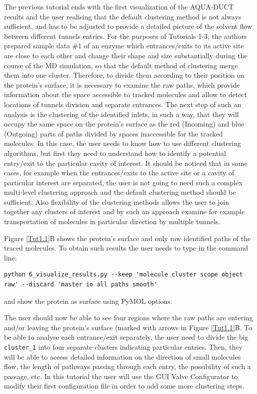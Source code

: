 \documentclass[9pt,tutorial]{livecoms}
\begin{document}
The previous tutorial ends with the first visualization of the AQUA-DUCT results and the user realising that the default clustering method is not always sufficient, and has to be adjusted to provide a detailed picture of the solvent flow between different tunnels entries. For the purposes of Tutorials 1-3, the authors prepared sample data \#1 of an enzyme which entrances/exits to its active site are close to each other and change their shape and size substantially during the course of the MD simulation, so that the default method of clustering merge them into one cluster. Therefore, to divide them according to their position on the protein's surface, it is necessary to examine the raw paths, which provide information about the space accessible to tracked molecules and allow to detect locations of tunnels division and separate entrances. The next step of such an analysis is the clustering of the identified inlets, in such a way, that they will occupy the same space on the protein's surface as the red (Incoming) and blue (Outgoing) parts of paths divided by spaces inaccessible for the tracked molecules. In this case, the user needs to know how to use different clustering algorithms, but first they need to understand how to identify a potential entry/exit to the particular cavity of interest. It should be noticed that in some cases, for example when the entrances/exits to the active site or a cavity of particular interest are separated, the user is not going to need such a complex multi-level clustering approach and the default clustering method should be sufficient. Also flexibility of the clustering methods allows the user to join together any clusters of interest and by such an approach examine for example transportation of molecules in particular direction by multiple tunnels.

Figure \ref{Tut1.1}B shows the protein's surface and only raw identified paths of the traced molecules. To obtain such results the user needs to type in the command line:
\begin{lstlisting}[columns=fullflexible]
python 6_visualize_results.py --keep 'molecule cluster scope object raw' --discard 'master io all paths smooth'
\end{lstlisting}
and show the protein as surface using PyMOL options.

The user should now be able to see four regions where the raw paths are entering and/or leaving the protein's surface (marked with arrows in Figure \ref{Tut1.1}B. To be able to analyse each entrance/exit separately, the user need to divide the big \texttt{cluster\_1} into four separate clusters indicating particular entries. Then, they will be able to access detailed information on the direction of small molecules flow, the length of pathways passing through each entry, the possibility of such a passage, etc. In this tutorial the user will use the GUI Valve Configurator to modify their first configuration file in order to add some more clustering steps. 
\end{document}
